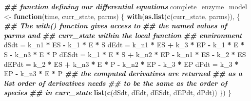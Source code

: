 \documentclass[
]{article}
\newenvironment{Shaded}{\begin{snugshade}}{\end{snugshade}}
\newcommand{\ControlFlowTok}[1]{\textcolor[rgb]{0.13,0.29,0.53}{\textbf{#1}}}
\newcommand{\DocumentationTok}[1]{\textcolor[rgb]{0.56,0.35,0.01}{\textbf{\textit{#1}}}}
\newcommand{\FunctionTok}[1]{\textcolor[rgb]{0.13,0.29,0.53}{\textbf{#1}}}
\newcommand{\NormalTok}[1]{#1}
\newcommand{\OtherTok}[1]{\textcolor[rgb]{0.56,0.35,0.01}{#1}}
\newcommand{\SpecialCharTok}[1]{\textcolor[rgb]{0.81,0.36,0.00}{\textbf{#1}}}
\begin{document}
\begin{Shaded}
\begin{Highlighting}[]
\DocumentationTok{\#\# function defining our differential equations}
\NormalTok{complete\_enzyme\_model }\OtherTok{\textless{}{-}} \ControlFlowTok{function}\NormalTok{(time, curr\_state,}
\NormalTok{    parms) \{}
    \FunctionTok{with}\NormalTok{(}\FunctionTok{as.list}\NormalTok{(}\FunctionTok{c}\NormalTok{(curr\_state, parms)), \{}
        \DocumentationTok{\#\# The with() function gives access to}
        \DocumentationTok{\#\# the named values of parms and}
        \DocumentationTok{\#\# curr\_state within the local function}
        \DocumentationTok{\#\# environment}
\NormalTok{        dSdt }\OtherTok{=}\NormalTok{ k\_n1 }\SpecialCharTok{*}\NormalTok{ ES }\SpecialCharTok{{-}}\NormalTok{ k\_1 }\SpecialCharTok{*}\NormalTok{ E }\SpecialCharTok{*}\NormalTok{ S}
\NormalTok{        dEdt }\OtherTok{=}\NormalTok{ k\_n1 }\SpecialCharTok{*}\NormalTok{ ES }\SpecialCharTok{+}\NormalTok{ k\_3 }\SpecialCharTok{*}\NormalTok{ EP }\SpecialCharTok{{-}}\NormalTok{ k\_1 }\SpecialCharTok{*}\NormalTok{ E }\SpecialCharTok{*}\NormalTok{ S }\SpecialCharTok{{-}}
\NormalTok{            k\_n3 }\SpecialCharTok{*}\NormalTok{ E }\SpecialCharTok{*}\NormalTok{ P}
\NormalTok{        dESdt }\OtherTok{=}\NormalTok{ k\_1 }\SpecialCharTok{*}\NormalTok{ E }\SpecialCharTok{*}\NormalTok{ S }\SpecialCharTok{+}\NormalTok{ k\_n2 }\SpecialCharTok{*}\NormalTok{ EP }\SpecialCharTok{{-}}\NormalTok{ k\_n1 }\SpecialCharTok{*}\NormalTok{ ES }\SpecialCharTok{{-}}
\NormalTok{            k\_2 }\SpecialCharTok{*}\NormalTok{ ES}
\NormalTok{        dEPdt }\OtherTok{=}\NormalTok{ k\_2 }\SpecialCharTok{*}\NormalTok{ ES }\SpecialCharTok{+}\NormalTok{ k\_n3 }\SpecialCharTok{*}\NormalTok{ E }\SpecialCharTok{*}\NormalTok{ P }\SpecialCharTok{{-}}\NormalTok{ k\_n2 }\SpecialCharTok{*}\NormalTok{ EP }\SpecialCharTok{{-}}
\NormalTok{            k\_3 }\SpecialCharTok{*}\NormalTok{ EP}
\NormalTok{        dPdt }\OtherTok{=}\NormalTok{ k\_3 }\SpecialCharTok{*}\NormalTok{ EP }\SpecialCharTok{{-}}\NormalTok{ k\_n3 }\SpecialCharTok{*}\NormalTok{ E }\SpecialCharTok{*}\NormalTok{ P}
        \DocumentationTok{\#\# the computed derivatives are returned}
        \DocumentationTok{\#\# as a list order of derivatives needs}
        \DocumentationTok{\#\# to be the same as the order of species}
        \DocumentationTok{\#\# in curr\_state}
        \FunctionTok{list}\NormalTok{(}\FunctionTok{c}\NormalTok{(dSdt, dEdt, dESdt, dEPdt, dPdt))}
\NormalTok{    \})}
\NormalTok{\}}
\end{Highlighting}
\end{Shaded}
\end{document}
